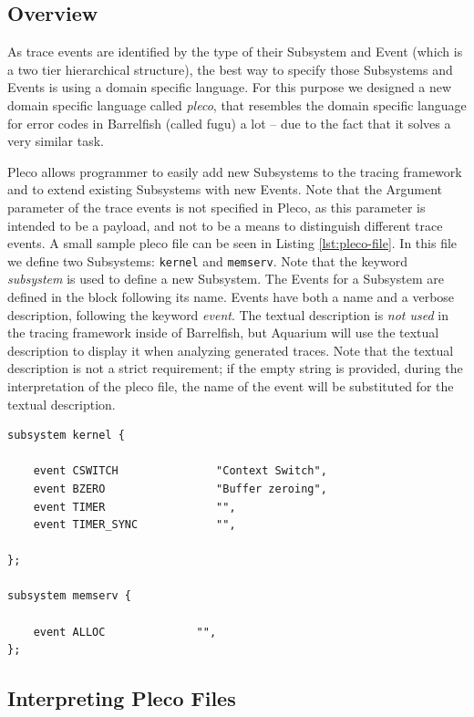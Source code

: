 \documentclass[a4paper,11pt,twoside]{report}
\begin{document}
\subsection{Overview}

As trace events are identified by the type of their Subsystem and Event (which
is a two tier hierarchical structure), the best way to specify those Subsystems
and Events is using a domain specific language. For this purpose we designed a
new domain specific language called \emph{pleco}, that resembles the domain
specific language for error codes in Barrelfish (called fugu) a lot -- due to
the fact that it solves a very similar task.

Pleco allows programmer to easily add new Subsystems to the tracing framework
and to extend existing Subsystems with new Events. Note that the Argument
parameter of the trace events is not specified in Pleco, as this parameter is
intended to be a payload, and not to be a means to distinguish different trace
events. A small sample pleco file can be seen in Listing
\ref{lst:pleco-file}. In this file we define two Subsystems: \texttt{kernel} and
\texttt{memserv}. Note that the keyword \emph{subsystem} is used to define a new
Subsystem. The Events for a Subsystem are defined in the block following its
name. Events have both a name and a verbose description, following the keyword
\emph{event}. The textual description is \emph{not used} in the tracing framework
inside of Barrelfish, but Aquarium will use the textual description to display
it when analyzing generated traces. Note that the textual description is not a
strict requirement; if the empty string is provided, during the interpretation
of the pleco file, the name of the event will be substituted for the textual
description.

\begin{code}
\begin{lstlisting}[frame=single, caption={A small example pleco file with two
	Subsystems.}, label={lst:pleco-file}]
subsystem kernel {

	event CSWITCH               "Context Switch",
	event BZERO                 "Buffer zeroing",
	event TIMER                 "",
	event TIMER_SYNC            "",

};

subsystem memserv {

	event ALLOC	             "",
};
\end{lstlisting}
\end{code}

\subsection{Interpreting Pleco Files}
\end{document}
